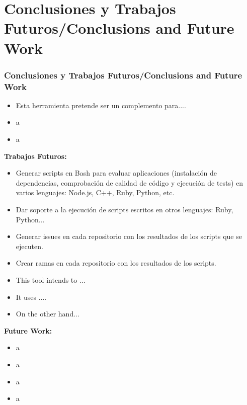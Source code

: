 \documentclass{beamer}
\begin{document}

\section{Conclusiones y Trabajos Futuros/Conclusions and Future Work}
\begin{frame}[allowframebreaks]
  \frametitle{Conclusiones y Trabajos Futuros/Conclusions and Future Work}
  
  \begin{itemize}
    \item Esta herramienta pretende ser un complemento para....
    \item a
    \item a
  \end{itemize}
  \framebreak
  
  {\bf Trabajos Futuros:}
  \begin{itemize}
    \item Generar scripts en Bash para evaluar aplicaciones (instalación de dependencias, comprobación de calidad de código y ejecución de tests) en varios lenguajes: Node.js, C++, Ruby, Python, etc.
    \item Dar soporte a la ejecución de scripts escritos en otros lenguajes: Ruby, Python...
    \item Generar issues en cada repositorio con los resultados de los scripts que se ejecuten.
    \item Crear ramas en cada repositorio con los resultados de los scripts.
  \end{itemize}
  \framebreak
  
  \begin{itemize}
    \item This tool intends to ...
    \item It uses ....
    \item On the other hand...
  \end{itemize}
  \framebreak
  
  {\bf Future Work:}
  \begin{itemize}
    \item a
    \item a
    \item a
    \item a
  \end{itemize}
\end{frame}
\end{document}
